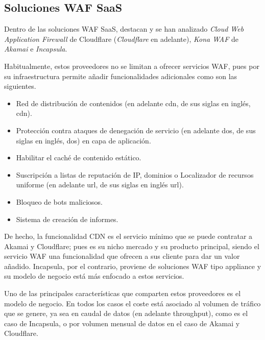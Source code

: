 \subsection{Soluciones WAF SaaS}
\par Dentro de las soluciones WAF SaaS, destacan y se han analizado {\em Cloud Web Application Firewall} \cite{cloudflarewaf} de Cloudflare\cite{cloudflare} ({\em Cloudflare} en adelante), {\em Kona WAF\cite{kona}} de {\em Akamai\cite{akamai}} e {\em Incapsula\cite{Incapsula}}.
\par Habitualmente, estos proveedores no se limitan a ofrecer servicios WAF, pues por su infraestructura permite añadir funcionalidades adicionales como son las siguientes.
\begin{itemize}
  \item Red de distribución de contenidos (en adelante \acrshort{cdn}, de sus siglas en inglés, \acrlong{cdn}).
  \item Protección contra ataques de denegación de servicio (en adelante \acrshort{dos}, de sus siglas en inglés, \acrlong{dos}) en capa de
    aplicación.
  \item Habilitar el caché de contenido estático.
  \item Suscripción a listas de reputación de IP, dominios o Localizador de recursos uniforme (en adelante \acrshort{url}, de sus siglas en inglés
    \acrlong{url}).
  \item Bloqueo de bots maliciosos.
  \item Sistema de creación de informes.
\end{itemize}
\par De hecho, la funcionalidad CDN es el servicio mínimo que se puede contratar a Akamai y Cloudflare; pues es su nicho mercado y su producto
principal, siendo el servicio WAF una funcionalidad que ofrecen a sus cliente para dar un valor añadido. Incapsula, por el contrario, proviene
de soluciones WAF tipo appliance y su modelo de negocio está más enfocado a estos servicios.
\par Uno de las principales características que comparten estos proveedores es el modelo de negocio. En todos los casos el coste está asociado
al volumen de tráfico que se genere, ya sea en caudal de datos (en adelante \gls{throughput}), como es el caso de Incapsula, o por volumen mensual de datos en el caso de Akamai y Cloudflare.

